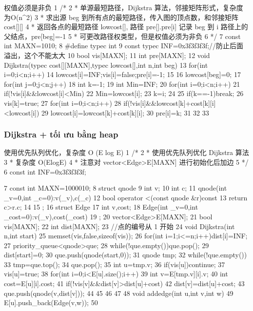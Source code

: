 \documentclass[11pt]{article}
\begin{document}
\begin{Code}
   权值必须是非负
 1 /*
 2 * 单源最短路径，Dijkstra 算法，邻接矩阵形式，复杂度为O(n^2)
 3 * 求出源 beg 到所有点的最短路径，传入图的顶点数，和邻接矩阵 cost[][]
 4 * 返回各点的最短路径 lowcost[], 路径 pre[].pre[i] 记录 beg 到 i 路径上的
       父结点，pre[beg]=-1
 5 * 可更改路径权类型，但是权值必须为非负
 6 */
 7 const int MAXN=1010;
 8 #define typec int
 9 const typec INF=0x3f3f3f3f;//防止后面溢出，这个不能太大
10 bool vis[MAXN];
11 int pre[MAXN];
12 void Dijkstra(typec cost[][MAXN],typec lowcost[],int n,int beg){
13     for(int i=0;i<n;i++){
14         lowcost[i]=INF;vis[i]=false;pre[i]=-1;
15     }
16     lowcost[beg]=0;
17     for(int j=0;j<n;j++){
18         int k=-1;
19         int Min=INF;
20         for(int i=0;i<n;i++)
21             if(!vis[i]&&lowcost[i]<Min){
22                 Min=lowcost[i];
23                 k=i;
24             }
25         if(k==-1)break;
26         vis[k]=true;
27         for(int i=0;i<n;i++)
28             if(!vis[i]&&lowcost[k]+cost[k][i]<lowcost[i]){
29                 lowcost[i]=lowcost[k]+cost[k][i];
30                 pre[i]=k;
31             }
32     }
33 }
\end{Code}

\subsubsection{Dijkstra + tối ưu bằng heap}

\begin{Code}
   使用优先队列优化，复杂度 O (E log E)
1 /*
2 * 使用优先队列优化 Dijkstra 算法
3 * 复杂度 O(ElogE)
4 * 注意对 vector<Edge>E[MAXN] 进行初始化后加边
5 */
6 const int INF=0x3f3f3f3f;


 7   const int MAXN=1000010;
 8   struct qnode{
 9       int v;
10       int c;
11       qnode(int _v=0,int _c=0):v(_v),c(_c){}
12       bool operator <(const qnode &r)const{
13           return c>r.c;
14       }
15   };
16   struct Edge{
17       int v,cost;
18       Edge(int _v=0,int _cost=0):v(_v),cost(_cost){}
19   };
20   vector<Edge>E[MAXN];
21   bool vis[MAXN];
22   int dist[MAXN];
23   //点的编号从 1 开始
24   void Dijkstra(int n,int start){
25       memset(vis,false,sizeof(vis));
26       for(int i=1;i<=n;i++)dist[i]=INF;
27       priority_queue<qnode>que;
28       while(!que.empty())que.pop();
29       dist[start]=0;
30       que.push(qnode(start,0));
31       qnode tmp;
32       while(!que.empty()){
33           tmp=que.top();
34           que.pop();
35           int u=tmp.v;
36           if(vis[u])continue;
37           vis[u]=true;
38           for(int i=0;i<E[u].size();i++){
39                int v=E[tmp.v][i].v;
40                int cost=E[u][i].cost;
41                if(!vis[v]&&dist[v]>dist[u]+cost){
42                    dist[v]=dist[u]+cost;
43                    que.push(qnode(v,dist[v]));
44                }
45           }
46       }
47   }
48   void addedge(int u,int v,int w){
49       E[u].push_back(Edge(v,w));
50   }
\end{Code}
\end{document}
